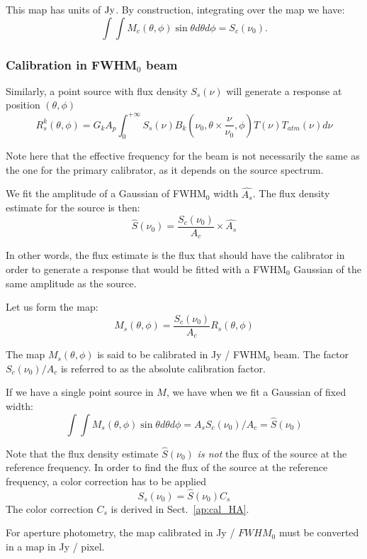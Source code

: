 This map has units of $\rm Jy$. By construction, integrating over the map we have:
\begin{equation}
\int\int M_{c}(\theta, \phi) \sin \theta d\theta d\phi = S_{c}(\nu_{0}).
\end{equation}



\subsubsection{Calibration in FWHM$_{0}$ beam}

Similarly, a point source with flux density $S_{s}(\nu)$ will
generate a response at position $(\theta, \phi)$
\begin{equation}
R_{s}^{k}(\theta, \phi) =  G_{k} A_{p}  \int_{0}^{+\infty}
S_{s}(\nu) B_{k}(\nu_{0}, \theta \times \frac{\nu}{\nu_{0}},
\phi) T(\nu) T_{atm}(\nu) d\nu
\end{equation}

Note here that the effective frequency for the beam is not necessarily
the same as the one for the primary calibrator, as it depends on the
source spectrum.

We fit the amplitude of a Gaussian of FWHM$_0$ width $\hat{A_{s}}$.
The flux density estimate for the source is then:
\begin{equation}
  \hat{S}(\nu_{0})  = \frac{S_{c}(\nu_{0})}{A_{c}} \times \hat{A_{s}}
\end{equation}

In other words, the flux estimate is the flux that should have the
calibrator in order to generate a response that would be fitted with a FWHM$_0$
Gaussian of the same amplitude as the source.

Let us form the map:
\begin{equation}
M_{s}(\theta, \phi) = \frac{S_{c} (\nu_{0})}{A_{c}}  R_{s}(\theta, \phi)   
\end{equation}

The map $M_{s}(\theta, \phi)$ is said to be calibrated in Jy / FWHM$_{0}$
beam. The factor $S_{c} (\nu_{0})/A_{c}$ is referred to as the
absolute calibration factor.

If we have a single point source in $M$, we have when we fit a Gaussian
of fixed width:
\begin{equation}
\int \int M_{s}(\theta, \phi) \sin \theta d\theta d\phi = \hat{A_{s}}  S_{c} (\nu_{0}) /
A_{c} = \hat{S}(\nu_{0})
\end{equation}

Note that the flux density estimate $\hat{S}(\nu_{0})$ {\em is not} the flux of the source at the
reference frequency. In order to find the flux of the source at the
reference frequency, a color correction has to be applied
\begin{equation}
S_{s}(\nu_{0}) = \hat{S}(\nu_{0})  C_{s}
\end{equation}
The color correction $C_{s}$ is derived in Sect.~\ref{ap:cal_HA}. 


For aperture photometry, the map calibrated in Jy / $FWHM_{0}$ must be
converted in a map in Jy / pixel. 


